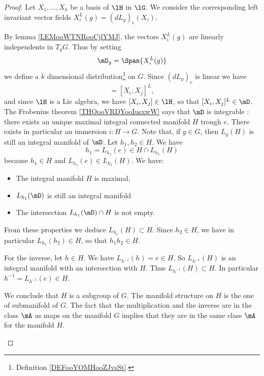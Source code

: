 \begin{theorem}
\begin{proof}
	Let \( X_1,\ldots, X_k\) be a basis of \( \lH\) in \( \lG\). We consider the corresponding left invariant vector fields \( X_i^L(g)=(dL_g)_e(X_i)\).
	\begin{subproof}
		\spitem[A distribution]
		By lemma \ref{LEMooWTNRooCjlYMJ}, the vectors \( X_i^L(g)\) are linearly independents in \( T_gG\). Thus by setting
		\begin{equation}
			\mD_g=\Span\{ X_i^L(g) \}
		\end{equation}
		we define a \( k\) dimensional distribution\footnote{Definition \ref{DEFooYOMHooZJvsSt}.} on \( G\).
		\spitem[Involutive]
		Since \( (dL_g)_e\) is linear we have
		\begin{equation}
			[X_i^L,X_j^L]=[X_i,X_j]^L,
		\end{equation}
		and since \( \lH\) is a Lie algebra, we have \( [X_i,X_j]\in \lH\), so that \( [X_i,X_j]^L\in\mD\).
		\spitem[Frobenius]
		The Frobenius theorem \ref{THOooVRDYooIusxwW} says that \( \mD\) is integrable : there exists an unique maximal integral connected manifold \( H\) trough \( e\). There exists in particular an immersion \( i\colon H\to G\).
		\spitem[\( H\) is a group]
		Note that, if \( g\in G\), then \( L_g(H)\) is still an integral manifold of \( \mD\). Let \( h_1,h_2\in H\). We have
		\begin{equation}
			h_1=L_{h_1}(e)\in H\cap L_{h_1}(H)
		\end{equation}
		because \( h_1\in H\) and \( L_{h_1}(e)\in L_{h_1}(H)\). We have:
		\begin{itemize}
			\item
			      The integral manifold \( H\) is maximal,
			\item
			      \( L_{h_1}(\mD)\) is still an integral manifold
			\item
			      The intersection \( L_{h_1}(\mD)\cap H\) is not empty.
		\end{itemize}
		From these properties we deduce \( L_{h_1}(H)\subset H\). Since \( h_2\in H\), we have in particular \( L_{h_1}(h_2)\in H\), so that \( h_1h_2\in H\).

		For the inverse, let \( h\in H\). We have \( L_{h^{-1}}(h)=e\in H\). So \( L_{h^{-1}}(H)\) is an integral manifold with an intersection with \( H\). Thus \( L_{h^{-1}}(H)\subset H\). In particular \( h^{-1}=L_{h^{-1}}(e)\in H\).

		We conclude that \( H\) is a subgroup of \( G\).
		The manifold structure on \( H\) is the one of submanifold of \( G\). The fact that the multiplication and the inverse are in the class \( \mA\) as maps on the manifold \( G\) implies that they are in the same class \( \mA\) for the manifold \( H\).


\end{subproof}
\end{proof}
\end{theorem}
